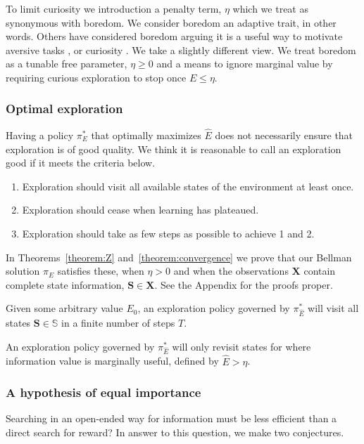To limit curiosity we introduction a penalty term, $\eta$ which we treat as synonymous with boredom. We consider boredom an adaptive trait, in other words. Others have considered boredom arguing it is a useful way to motivate aversive tasks \cite{Bench2013}, or curiosity \cite{Loewenstein1994}. We take a slightly different view. We treat boredom as a tunable free parameter, $\eta \ge 0$ and a means to ignore marginal value by requiring curious exploration to stop once $E \le \eta$. 


\subsubsection*{Optimal exploration}
Having a policy $\pi_E^*$ that optimally maximizes $\hat E$ does not necessarily ensure that exploration is of good quality. We think it is reasonable to call an exploration good if it meets the criteria below. 

\begin{enumerate}
	\item Exploration should visit all available states of the environment at least once.
	\item Exploration should cease when learning has plateaued.
	\item Exploration should take as few steps as possible to achieve 1 and 2.
\end{enumerate}

In Theorems~\ref{theorem:Z} and~\ref{theorem:convergence} we prove that our Bellman solution $\pi_E$ satisfies these, when $\eta > 0$ and when the observations $\mathbf{X}$ contain complete state information, $\mathbf{S} \in \mathbf{X}$. See the Appendix for the proofs proper.

\begin{theorem} 
	\label{theorem:Z} 
	Given some arbitrary value $E_0$, an exploration policy governed by $\pi^*_{\hat E}$ will visit all states $\mathbf{S} \in \mathbb{S}$ in a finite number of steps $T$.
\end{theorem}

\begin{theorem} 
	\label{theorem:convergence} 
	An exploration policy governed by $\pi^*_{\hat E}$ will only revisit states for where information value is marginally useful, defined by $\hat E > \eta$.  
\end{theorem}


\subsubsection*{A hypothesis of equal importance}
 Searching in an open-ended way for information must be less efficient than a direct search for reward? In answer to this question, we make two conjectures.


